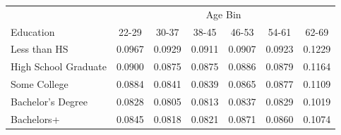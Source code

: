 \begin{tabular}{lcccccc}
\hline\hline
 & \multicolumn{6}{c}{Age Bin} \\
Education & 22-29 & 30-37 & 38-45 & 46-53 & 54-61 & 62-69 \\
\hline
Less than HS&0.0967&0.0929&0.0911&0.0907&0.0923&0.1229\\
High School Graduate&0.0900&0.0875&0.0875&0.0886&0.0879&0.1164\\
Some College&0.0884&0.0841&0.0839&0.0865&0.0877&0.1109\\
Bachelor's Degree&0.0828&0.0805&0.0813&0.0837&0.0829&0.1019\\
Bachelors+&0.0845&0.0818&0.0821&0.0871&0.0860&0.1074\\
\hline\hline
\end{tabular}

